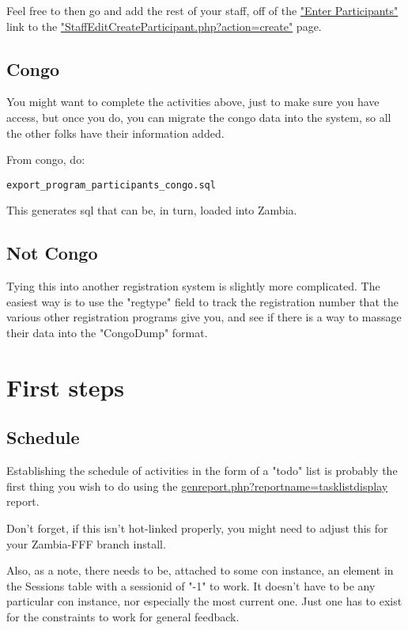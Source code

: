 \documentclass[captions=tablesignature]{scrartcl}
\begin{document}
Feel free to then go and add the rest of your staff, off of the
\href{../webpages/StaffEditCreateParticipant.php?action=create}{"Enter Participants"} link to the
\href{../webpages/StaffEditCreateParticipant.php?action=create}{"StaffEditCreateParticipant.php?action=create"} page.

\subsection{Congo}
\label{sec-7-2}

You might want to complete the activities above, just to make sure
you have access, but once you do, you can migrate the congo data
into the system, so all the other folks have their information
added.

From congo, do:
\begin{verbatim}
export_program_participants_congo.sql
\end{verbatim}

This generates sql that can be, in turn, loaded into Zambia.
\subsection{Not Congo}
\label{sec-7-3}

Tying this into another registration system is slightly more
complicated.  The easiest way is to use the "regtype" field to
track the registration number that the various other registration
programs give you, and see if there is a way to massage their data
into the "CongoDump" format.

\section{First steps}
\label{sec-8}
\subsection{Schedule}
\label{sec-8-1}

Establishing the schedule of activities in the form of a "todo"
list is probably the first thing you wish to do using the 
\href{../webpages/genreport.php?reportname=tasklistdisplay}{genreport.php?reportname=tasklistdisplay} report.

Don't forget, if this isn't hot-linked properly, you might need to
adjust this for your Zambia-FFF branch install.

Also, as a note, there needs to be, attached to some con instance,
an element in the Sessions table with a sessionid of "-1" to work.
It doesn't have to be any particular con instance, nor especially
the most current one.  Just one has to exist for the constraints to
work for general feedback.
\end{document}

